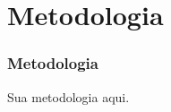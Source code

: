 \section{Metodologia}
\begin{frame}
  \frametitle{Metodologia}

  Sua metodologia aqui.

\end{frame}